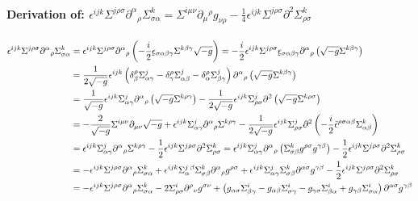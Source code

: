 \documentclass[10pt]{report}
\newcommand{\utilde}[1]{\underaccent{\tilde}{#1}}
\theoremstyle{definition}
\newcommand{\teps}[0]{\tilde{\epsilon}}
\begin{document}
        \paragraph{Derivation of: \texorpdfstring{$\epsilon^{ijk} \Sigma^{j\rho\sigma} \partial^\alpha{}_\rho \Sigma^k_{\sigma\alpha} = \Sigma^{i\mu\nu} \partial_\mu{}^\rho g_{\nu\rho} - \frac{1}{4} \epsilon^{ijk} \Sigma^{j\rho\sigma} \partial^2 \Sigma^k_{\rho\sigma}$}{PDFString}}
        \begin{align}
            \epsilon^{ijk} \Sigma^{j\rho\sigma} \partial^\alpha{}_\rho \Sigma^k_{\sigma\alpha} &= \epsilon^{ijk} \Sigma^{j\rho\sigma} \partial^\alpha{}_\rho \left( -\frac{i}{2}\utilde{\epsilon}_{\sigma\alpha\beta\gamma} \Sigma^{k\beta\gamma} \sqrt{-g} \right) = -\frac{i}{2}\epsilon^{ijk} \Sigma^{j\rho\sigma} \utilde{\epsilon}_{\sigma\alpha\beta\gamma} \partial^\alpha{}_\rho \left( \sqrt{-g} \Sigma^{k\beta\gamma} \right) \nonumber\nonumber\\ &= \frac{1}{2\sqrt{-g}} \epsilon^{ijk} \left( \delta^\rho_\beta \Sigma^j_{\alpha\gamma} - \delta^\rho_\gamma \Sigma^j_{\alpha\beta} - \delta^\rho_\alpha \Sigma^j_{\beta\gamma} \right) \partial^\alpha{}_\rho \left( \sqrt{-g} \Sigma^{k\beta\gamma} \right) \nonumber\nonumber\\ &= \frac{1}{\sqrt{-g}}\epsilon^{ijk} \Sigma^j_{\alpha\gamma} \partial^\alpha{}_\rho \left( \sqrt{-g} \Sigma^{k\rho\gamma} \right) - \frac{1}{2\sqrt{-g}} \epsilon^{ijk} \Sigma^j_{\rho\sigma} \partial^2 \left( \sqrt{-g} \Sigma^{k\rho\sigma} \right) \nonumber\nonumber\\ &= -\frac{2}{\sqrt{-g}} \Sigma^{i\mu\nu} \partial_{\mu\nu} \sqrt{-g} + \epsilon^{ijk} \Sigma^j_{\alpha\gamma} \partial^\alpha{}_\rho \Sigma^{k\rho\gamma} - \frac{1}{2\sqrt{-g}} \epsilon^{ijk} \Sigma^j_{\rho\sigma} \partial^2 \left( -\frac{i}{2} \teps^{\rho\sigma\alpha\beta} \Sigma^k_{\alpha\beta} \right) \nonumber\nonumber\\ &= \epsilon^{ijk} \Sigma^j_{\alpha\gamma} \partial^\alpha{}_\rho \Sigma^{k\rho\gamma} - \frac{1}{2}\epsilon^{ijk} \Sigma^{j\rho\sigma} \partial^2 \Sigma^k_{\rho\sigma} = \epsilon^{ijk} \Sigma^j_{\alpha\gamma} \partial^\alpha{}_\rho \left( \Sigma^k_{\sigma\beta} g^{\rho\sigma} g^{\gamma\beta} \right) - \frac{1}{2}\epsilon^{ijk} \Sigma^{j\rho\sigma} \partial^2 \Sigma^k_{\rho\sigma} \nonumber\nonumber\\ &= -\epsilon^{ijk} \Sigma^{j\rho\sigma} \partial^\alpha{}_\rho \Sigma^k_{\sigma\alpha} + \epsilon^{ijk} \Sigma^j_\alpha{}^\beta \Sigma^k_{\sigma\beta} \partial^\alpha{}_\rho g^{\rho\sigma} + \epsilon^{ijk}\Sigma^j_{\alpha\gamma} \Sigma^k_{\sigma\beta} \partial^{\alpha\sigma} g^{\gamma\beta} - \frac{1}{2}\epsilon^{ijk} \Sigma^{j\rho\sigma} \partial^2 \Sigma^k_{\rho\sigma} \nonumber\nonumber\\ &= -\epsilon^{ijk} \Sigma^{j\rho\sigma} \partial^\alpha{}_\rho \Sigma^k_{\sigma\alpha} - 2\Sigma^i_{\rho\sigma} \partial^\rho{}_\nu g^{\sigma\nu} + \left( g_{\alpha\sigma} \Sigma^i_{\beta\gamma} - g_{\alpha\beta} \Sigma^i_{\sigma\gamma} - g_{\gamma\sigma} \Sigma^i_{\beta\alpha} + g_{\gamma\beta} \Sigma^i_{\sigma\alpha} \right) \partial^{\alpha\sigma} g^{\gamma\beta} \nonumber\nonumber\\ 
\end{align}
\end{document}
